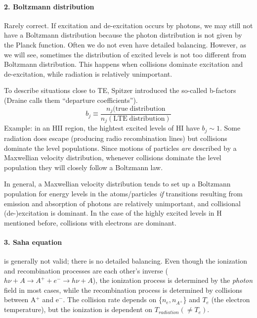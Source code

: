\documentclass[11pt]{article}
\newcommand{\mar}[1]{\hspace{0pt}\marginpar{-\textcolor{black}{#1}-}}
\begin{document}
\paragraph{2. Boltzmann distribution}
\mar{21}Rarely correct.
If excitation and de-excitation occurs by photons, we may still not have a
Boltzmann distribution because the photon distribution is not given by the
Planck function. Often we do not even have detailed balancing.
However, as we will see, sometimes the distribution of excited levels
is not too different from Boltzmann distribution. This happens when collisions
dominate excitation and de-excitation, while radiation is relatively unimportant.

To describe situations close to TE, Spitzer introduced the so-called
b-factors (Draine calls them ``departure coefficients'').
\[
    b_{j} \equiv
    \frac{n_{j}(\mathrm{true\; distribution}}{n_{j}(\mathrm{LTE\; distribution})}
    \]
Example: in an HII region, the hightest excited levels of HI have $b_{j} \sim 1$.
Some radiation does escape (producing radio recombination lines) but collisions
dominate the level populations. Since motions of particles \emph{are} described
by a Maxwellian velocity distribution, whenever collisions dominate the level
population they will closely follow a Boltzmann law.

\mar{22}In general, a Maxwellian velocity distribution tends to set up a
Boltzmann population for energy levels in the atoms/particles \emph{if}
transitions resulting from emission and absorption of photons are
relatively unimportant, and collisional (de-)excitation is dominant. In the
case of the highly excited levels in H mentioned before, collisions with
electrons are dominant.

\paragraph{3. Saha equation} is generally not valid; there is no detailed
balancing. Even though the ionization and recombination processes are
each other's inverse
\newline
($h\nu + A \rightarrow A^{+} + e^{-} \rightarrow h\nu + A$),
\newline
the ionization process is determined by the \emph{photon} field in most
cases, while the recombination process is determined by collisions between
A$^{+}$ and e$^{-}$. The collision rate depends on \{$n_{e}, n_{A^{+}}$\}
and $T_{e}$ (the electron temperature), but the ionization is dependent on
$T_{radiation} (\neq T_{e})$.
\end{document}

